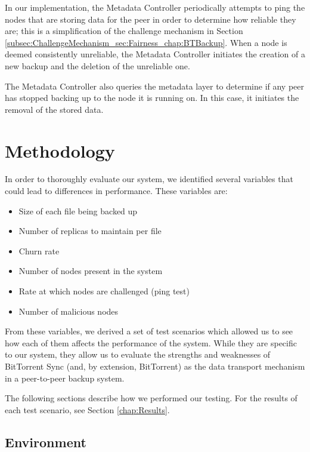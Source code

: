 \documentclass[12pt]{report}
\begin{document}
In our implementation, the Metadata Controller periodically attempts to ping the nodes that are storing data for the peer in order to determine how reliable they are; this is a simplification of the challenge mechanism in Section \ref{subsec:ChallengeMechanism_sec:Fairness_chap:BTBackup}. When a node is deemed consistently unreliable, the Metadata Controller initiates the creation of a new backup and the deletion of the unreliable one.

The Metadata Controller also queries the metadata layer to determine if any peer has stopped backing up to the node it is running on. In this case, it initiates the removal of the stored data.

\chapter{Methodology} \label{chap:Methodology}

In order to thoroughly evaluate our system, we identified several variables that could lead to differences in performance. These variables are:

\begin{itemize}
\item Size of each file being backed up
\item Number of replicas to maintain per file
\item Churn rate
\item Number of nodes present in the system
\item Rate at which nodes are challenged (ping test)
\item Number of malicious nodes
\end{itemize}

From these variables, we derived a set of test scenarios which allowed us to see how each of them affects the performance of the system. While they are specific to our system, they allow us to evaluate the strengths and weaknesses of BitTorrent Sync (and, by extension, BitTorrent) as the data transport mechanism in a peer-to-peer backup system.

The following sections describe how we performed our testing. For the results of each test scenario, see Section \ref{chap:Results}.

\section{Environment} \label{sec:Environment_chap:Methodology}

\end{document}
